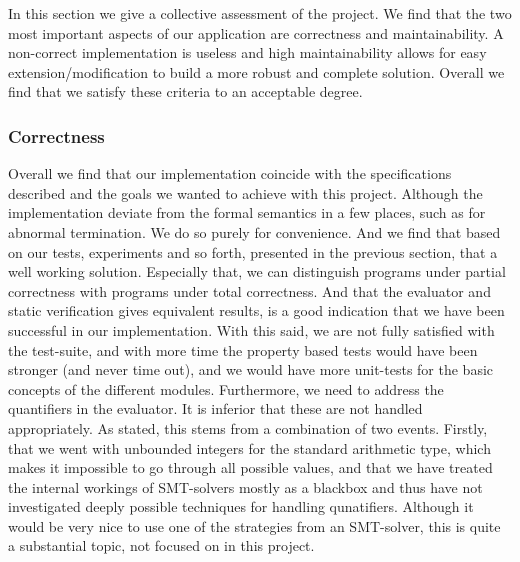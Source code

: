 In this section we give a collective assessment of the project.
We find that the two most important aspects of our application are correctness and maintainability. A non-correct implementation is useless and high maintainability allows for easy extension/modification to build a more robust and complete solution.
Overall we find that we satisfy these criteria to an acceptable degree.



\subsubsection{Correctness}
Overall we find that our implementation coincide with the specifications described and the goals we wanted to achieve with this project.
Although the implementation deviate from the formal semantics in a few places, such as for abnormal termination. We do so purely for convenience.
And we find that based on our tests, experiments and so forth, presented in the previous section, that a well working solution.
Especially that, we can distinguish programs under partial correctness with programs under total correctness. And that the evaluator and static verification gives equivalent results, is a good indication that we have been successful in our implementation.
With this said, we are not fully satisfied with the test-suite, and with more time the property based tests would have been stronger (and never time out), and we would have more unit-tests for the basic concepts of the different modules.
Furthermore, we need to address the quantifiers in the evaluator.
It is inferior that these are not handled appropriately.
As stated, this stems from a combination of two events.
Firstly, that we went with unbounded integers for the standard arithmetic type, which makes it impossible to go through all possible values, and that we have treated the internal workings of SMT-solvers mostly as a blackbox and thus have not investigated deeply possible techniques for handling qunatifiers. Although it would be very nice to use one of the strategies from an SMT-solver, this is quite a substantial topic, not focused on in this project.

